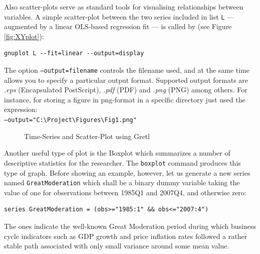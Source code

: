 \documentclass[11pt]{article}
\begin{document}
Also scatter-plots serve as standard tools for visualising relationships between variables. A simple scatter-plot between the two series included in list \texttt{L} --- augmented by a linear OLS-based regression fit --- is called by (see Figure \ref{fig:XYplot}):
\begin{Verbatim}[baselinestretch=0.75, fontsize=\small]
gnuplot L --fit=linear --output=display
\end{Verbatim}
The option \texttt{---output=filename} controls the filename used, and at the same time allows you to specify a particular output format. Supported output formats are \textit{.eps} (Encapsulated PostScript), \textit{.pdf} (PDF) and \textit{.png} (PNG) among others. For instance, for storing a figure in png-format in a specific directory just used the expression: \\
\texttt{---output="C:\textbackslash{Project}\textbackslash{Figures}\textbackslash{Fig1}.png"}

\begin{figure}[h!]
	\centering

	\caption{Time-Series and Scatter-Plot using Gretl}
	\label{fig:Plot1}
\end{figure}

Another useful type of plot is the Boxplot which summarizes a number of descriptive statistics for the researcher. The \texttt{boxplot} command produces this type of graph. Before showing an example, however, let us generate a new series named \texttt{GreatModeration} which shall be a binary dummy variable taking the value of one for observations between 1985Q1 and 2007Q4, and otherwise zero:
\begin{Verbatim}[baselinestretch=0.75, fontsize=\small]
series GreatModeration = (obs>="1985:1" && obs<="2007:4")
\end{Verbatim}
The ones indicate the well-known Great Moderation period during which business cycle indicators such as GDP growth and price inflation rates followed a rather stable path associated with only small variance around some mean value.
\end{document}
